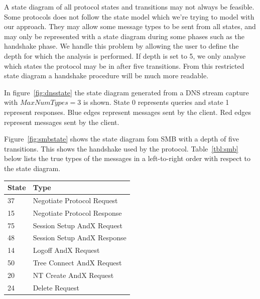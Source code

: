 \documentclass[a4paper]{report}
\begin{document}
A state diagram of all protocol states and transitions may not always be
feasible. Some protocols does not follow the state model which we're 
trying to model with our approach. They may allow some message types to
be sent from all states, and may only be represented with a state diagram
during some phases such as the handshake phase. We handle this problem by
allowing the user to define the depth for which the analysis is performed.
If depth is set to 5, we only analyse which states the protocol may be in
after five transitions. From this restricted state diagram a handshake
procedure will be much more readable.


In figure~\ref{fig:dnsstate} the state diagram generated from a DNS stream
capture with $MaxNumTypes = 3$ is shown. State 0 represents queries and state 1
represent responses. Blue edges represent messages sent by the client. Red
edges represent messages sent by the client.

Figure~\ref{fig:smbstate} shows the state diagram fom SMB with a depth of
five transitions. This shows the handshake used by the protocol.
Table~\ref{tbl:smb} below lists the true types of the messages in a
left-to-right order with respect to the state diagram.

\begin{center}
    \begin{tabular}{ | l | l |}
        \hline
        \textbf{State}&\textbf{Type}\\ \hline
        37          & Negotiate Protocol Request    \\ \hline
        15          & Negotiate Protocol Response   \\ \hline
        75          & Session Setup AndX Request    \\ \hline
        48          & Session Setup AndX Response   \\ \hline
        14          & Logoff AndX Request           \\ \hline
        50          & Tree Connect AndX Request     \\ \hline
        20          & NT Create AndX Request        \\ \hline
        24          & Delete Request                \\ \hline
    \end{tabular}
    \label{tbl:smb}
\end{center}
\end{document}
